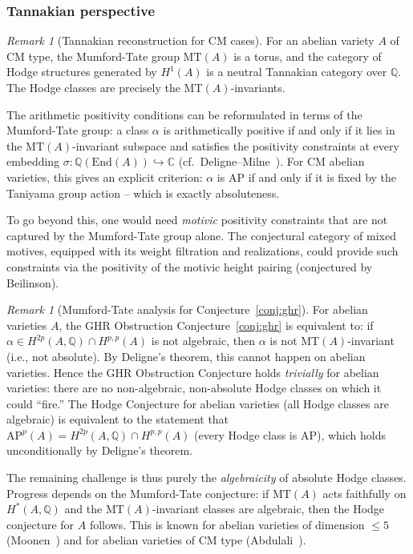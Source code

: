 \documentclass[aps,prd,twocolumn,superscriptaddress,nofootinbib]{revtex4-2}
\theoremstyle{definition}
\theoremstyle{remark}
\newtheorem{remark}[theorem]{Remark}
\begin{document}
\subsubsection{Tannakian perspective}

\begin{remark}[Tannakian reconstruction for CM cases]
\label{rem:tannakian}
For an abelian variety $A$ of CM type, the Mumford-Tate group $\mathrm{MT}(A)$ is a torus, and the category of Hodge structures generated by $H^1(A)$ is a neutral Tannakian category over $\mathbb{Q}$. The Hodge classes are precisely the $\mathrm{MT}(A)$-invariants.

The arithmetic positivity conditions can be reformulated in terms of the Mumford-Tate group: a class $\alpha$ is arithmetically positive if and only if it lies in the $\mathrm{MT}(A)$-invariant subspace and satisfies the positivity constraints at every embedding $\sigma: \mathbb{Q}(\mathrm{End}(A)) \hookrightarrow \mathbb{C}$ (cf.\ Deligne--Milne~\cite{DeligneMilne1982}). For CM abelian varieties, this gives an explicit criterion: $\alpha$ is AP if and only if it is fixed by the Taniyama group action -- which is exactly absoluteness.

To go beyond this, one would need \textit{motivic} positivity constraints that are not captured by the Mumford-Tate group alone. The conjectural category of mixed motives, equipped with its weight filtration and realizations, could provide such constraints via the positivity of the motivic height pairing (conjectured by Beilinson).
\end{remark}

\begin{remark}[Mumford-Tate analysis for Conjecture~\ref{conj:ghr}]
\label{rem:mumford-tate-ghr}
For abelian varieties $A$, the GHR Obstruction Conjecture~\ref{conj:ghr} is equivalent to: if $\alpha \in H^{2p}(A, \mathbb{Q}) \cap H^{p,p}(A)$ is not algebraic, then $\alpha$ is not $\mathrm{MT}(A)$-invariant (i.e., not absolute). By Deligne's theorem, this cannot happen on abelian varieties. Hence the GHR Obstruction Conjecture holds \textit{trivially} for abelian varieties: there are no non-algebraic, non-absolute Hodge classes on which it could ``fire.'' The Hodge Conjecture for abelian varieties (all Hodge classes are algebraic) is equivalent to the statement that $\mathrm{AP}^p(A) = H^{2p}(A, \mathbb{Q}) \cap H^{p,p}(A)$ (every Hodge class is AP), which holds unconditionally by Deligne's theorem.

The remaining challenge is thus purely the \textit{algebraicity} of absolute Hodge classes. Progress depends on the Mumford-Tate conjecture: if $\mathrm{MT}(A)$ acts faithfully on $H^*(A, \mathbb{Q})$ and the $\mathrm{MT}(A)$-invariant classes are algebraic, then the Hodge conjecture for $A$ follows. This is known for abelian varieties of dimension $\leq 5$ (Moonen~\cite{Moonen1999}) and for abelian varieties of CM type (Abdulali~\cite{Abdulali1994}).
\end{remark}
\end{document}
